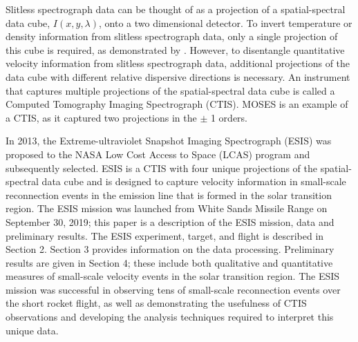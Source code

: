     Slitless spectrograph data can be thought of as a projection of a spatial-spectral data cube, $I(x,y,\lambda)$, onto a two dimensional detector.  
    To invert temperature or density information from slitless spectrograph data, only a single projection of this cube is required, as demonstrated by \cite{winebarger2019}.  
    However, to disentangle quantitative velocity information from slitless spectrograph data, additional projections of the data cube with different relative dispersive directions is necessary.  
    An instrument that captures multiple projections of the spatial-spectral data cube is called a Computed Tomography Imaging Spectrograph (CTIS).  MOSES is an example of a CTIS, as it captured two projections in the $\pm$ 1 orders.  
    
    In 2013, the Extreme-ultraviolet Snapshot Imaging Spectrograph (ESIS) was proposed to the NASA Low Cost Access to Space (LCAS) program and subsequently selected.  
    ESIS is a CTIS with four unique projections of the spatial-spectral data cube and is designed to capture velocity information in small-scale reconnection events in the \ov emission line that is formed in the solar transition region.  
    The ESIS mission was launched from White Sands Missile Range on September 30,  2019; this paper is a description of the ESIS mission, data and preliminary results.  
    The ESIS experiment, target, and flight is described in Section 2.  
    Section 3 provides information on the data processing.  Preliminary results are given in Section 4; these include both qualitative and quantitative measures of small-scale velocity events in the solar transition region.  The ESIS mission was successful in  observing tens of small-scale reconnection events over the short rocket flight, as well as demonstrating the usefulness of CTIS observations and developing the analysis techniques required to interpret this unique data.


